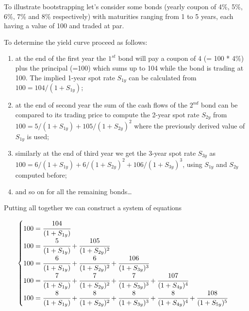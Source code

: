 To illustrate bootstrapping let's consider some bonds (yearly coupon of 4\%, 5\%, 6\%, 7\% and 8\% respectively) with maturities ranging from 1 to 5 years, each having a value of 100 and traded at par. 

To determine the yield curve proceed as follows:
\begin{enumerate}
\item at the end of the first year the $1^{st}$ bond will pay a coupon of 4 (= 100 * 4\%) plus the principal (=100) which sums up to 104 while the bond is trading at 100. The implied 1-year spot rate $S_{1y}$ can be calculated from $\mbox{100} = \mbox{104} / (1 + S_{1y})$;

\item at the end of second year the sum of the cash flows of the $2^{nd}$ bond can be compared to its trading price to compute the 2-year spot rate $S_{2y}$ from $\mbox{100} = \mbox{5} / (1 + S_{1y}) + \mbox{105} / (1 + S_{2y})^{2}$ where the previously derived value of $S_{1y}$ is used;

\item similarly at the end of third year we get the 3-year spot rate $S_{3y}$ as $\mbox{100} = \mbox{6} / (1 + S_{1y}) + \mbox{6} / (1 + S_{2y})^{2} + \mbox{106} / (1 + S_{3y})^{3}$, using $S_{1y}$ and $S_{2y}$ computed before;

\item and so on for all the remaining bonds\ldots
\end{enumerate}

Putting all together we can construct a system of equations

\begin{equation}
\begin{cases}
100 = \cfrac{104}{(1 + S_{1y})} \\
100 = \cfrac{5}{(1 + S_{1y})} + \cfrac{105}{(1 + S_{2y})^{2}} \\
100 = \cfrac{6} {(1 + S_{1y})} + \cfrac{6}{(1 + S_{2y})^{2}} + \cfrac{106} {(1 + S_{3y})^{3}} \\
100 = \cfrac{7} {(1 + S_{1y})} + \cfrac{7} {(1 + S_{2y})^{2}} + \cfrac{7} {(1 + S_{3y})^{3}} + \cfrac{107} {(1 + S_{4y})^{4}} \\
100 = \cfrac{8} {(1 + S_{1y})} + \cfrac{8} {(1 + S_{2y})^{2}}+ \cfrac{8} {(1 + S_{3y})^{3}} + \cfrac{8} {(1 + S_{4y})^{4}} + \cfrac{108} {(1 + S_{5y})^{5}}
\end{cases}
\label{eq:fifth_year_rate}
\end{equation}

